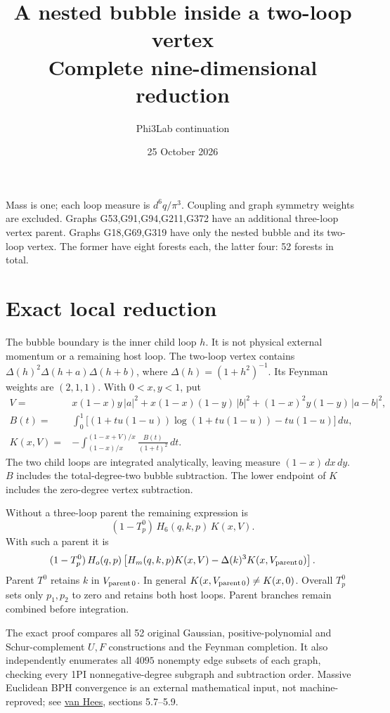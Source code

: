 \documentclass[11pt]{article}
\title{A nested bubble inside a two-loop vertex\\Complete nine-dimensional reduction}
\author{Phi3Lab continuation}
\date{25 October 2026}
\begin{document}
\maketitle
Mass is one; each loop measure is $d^6q/\pi^3$. Coupling and graph symmetry weights are excluded.
Graphs G53,G91,G94,G211,G372 have an additional three-loop vertex parent.
Graphs G18,G69,G319 have only the nested bubble and its two-loop vertex.
The former have eight forests each, the latter four: 52 forests in total.

\section*{Exact local reduction}
The bubble boundary is the inner child loop $h$. It is not physical external momentum
or a remaining host loop. The two-loop vertex contains
$\Delta(h)^2\Delta(h+a)\Delta(h+b)$, where $\Delta(h)=(1+h^2)^{-1}$.
Its Feynman weights are $(2,1,1)$. With $0<x,y<1$, put
\begin{align}
 V={}&x(1-x)y\,|a|^2+x(1-x)(1-y)\,|b|^2
       +(1-x)^2y(1-y)\,|a-b|^2,\\
 B(t)={}&\int_0^1\big[(1+t u(1-u))\log(1+t u(1-u))-t u(1-u)\big]\,du,\\
 K(x,V)={}&-\int_{(1-x)/x}^{(1-x+V)/x}\frac{B(t)}{(1+t)^2}\,dt.
\end{align}
The two child loops are integrated analytically, leaving measure $(1-x)\,dx\,dy$.
$B$ includes the total-degree-two bubble subtraction. The lower endpoint of $K$
includes the zero-degree vertex subtraction.

Without a three-loop parent the remaining expression is
\[
 (1-T_p^0)\,H_6(q,k,p)\,K(x,V).
\]
With such a parent it is
\[
 (1-T_p^0)\,H_o(q,p)
 \left[H_m(q,k,p)K(x,V)-\Delta(k)^3K(x,V_{\rm parent\,0})\right].
\]
Parent $T^0$ retains $k$ in $V_{\rm parent\,0}$. In general
$K(x,V_{\rm parent\,0})\ne K(x,0)$. Overall $T_p^0$ sets only $p_1,p_2$ to zero
and retains both host loops. Parent branches remain combined before integration.

The exact proof compares all 52 original Gaussian, positive-polynomial and
Schur-complement $U,F$ constructions and the Feynman completion. It also
independently enumerates all $4095$ nonempty edge subsets of each graph, checking
every 1PI nonnegative-degree subgraph and subtraction order.
Massive Euclidean BPH convergence is an external mathematical input, not
machine-reproved; see
\href{https://itp.uni-frankfurt.de/~hees/publ/lect.pdf}{van Hees}, sections 5.7--5.9.
\end{document}
